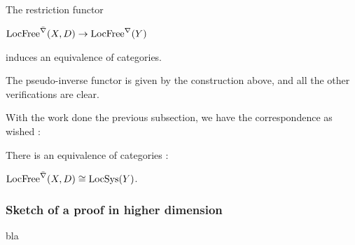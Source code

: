 \begin{mytheo}
The restriction functor 
\begin{center}
$\text{LocFree}^{\bar{\nabla}}(X,D) \to \text{LocFree}^{\nabla}(Y)$
\end{center}
induces an equivalence of categories.
\end{mytheo}

\begin{mydemo}
The pseudo-inverse functor is given by the construction above, and all the other verifications are clear.
\end{mydemo}


With the work done the previous subsection, we have the correspondence as wished :


\begin{mycoro}
There is an equivalence of categories :
\begin{center}
$\text{LocFree}^{\bar{\nabla}}(X,D) \cong \text{LocSys}(Y)$.
\end{center}
\end{mycoro}




\subsubsection{Sketch of a proof in higher dimension}

bla
